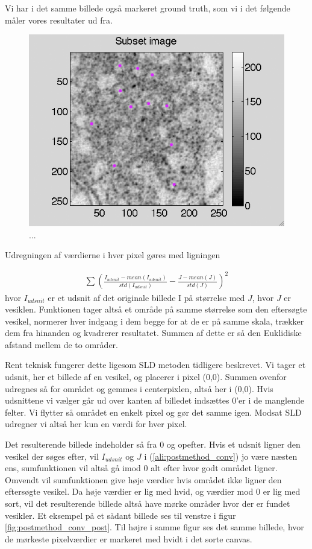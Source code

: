 Vi har i det samme billede også markeret ground truth, som vi i det følgende måler vores resultater ud fra.

\begin{figure}[H]
		\centering
		\includegraphics[scale=0.7]{files/postmethod/img/ground_truth.png}
	\caption{...\label{fig:postmethod_conv_gt}}
\end{figure}

Udregningen af værdierne i hver pixel gøres med ligningen

\begin{align}
	\sum \left(\frac{I_{udsnit}-mean(I_{udsnit})}{std(I_{udsnit})}-\frac{J-mean(J)}{std(J)}\right)^2 \label{ali:postmethod_conv}
\end{align}
hvor $I_{udsnit}$ er et udsnit af det originale billede I på størrelse med $J$, hvor $J$ er vesiklen. Funktionen tager altså et område på samme størrelse som den eftersøgte vesikel, normerer hver indgang i dem begge for at de er på samme skala, trækker dem fra hinanden og kvadrerer resultatet. Summen af dette er så den Euklidiske afstand mellem de to områder.

Rent teknisk fungerer dette ligesom SLD metoden tidligere beskrevet. Vi tager et udsnit, her et billede af en vesikel, og placerer i pixel (0,0). Summen ovenfor udregnes så for området og gemmes i centerpixlen, altså her i (0,0). Hvis udsnittene vi vælger går ud over kanten af billedet indsættes 0'er i de manglende felter. Vi flytter så området en enkelt pixel og gør det samme igen. Modsat SLD udregner vi altså her kun en værdi for hver pixel. 

Det resulterende billede indeholder så fra 0 og opefter. Hvis et udsnit ligner den vesikel der søges efter, vil $I_{udsnit}$ og $J$ i (\ref{ali:postmethod_conv}) jo være næsten ens, sumfunktionen vil altså gå imod 0 alt efter hvor godt området ligner. Omvendt vil sumfunktionen give høje værdier hvis området ikke ligner den eftersøgte vesikel. Da høje værdier er lig med hvid, og værdier mod 0 er lig med sort, vil det resulterende billede altså have mørke områder hvor der er fundet vesikler. Et eksempel på et sådant billede ses til venstre i figur \ref{fig:postmethod_conv_post}. Til højre i samme figur ses det samme billede, hvor de mørkeste pixelværdier er markeret med hvidt i det sorte canvas.

